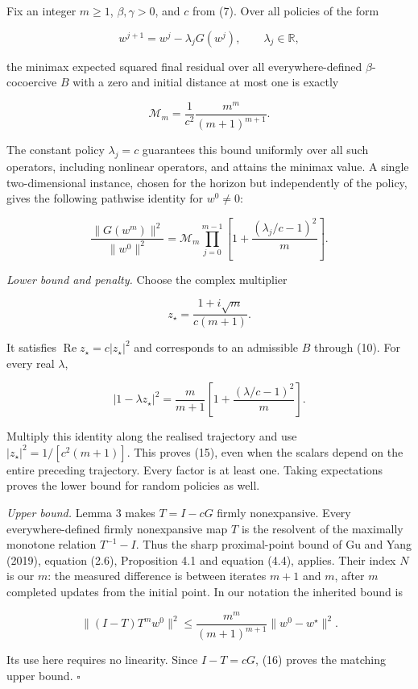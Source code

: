 \documentclass[
  british,
  11pt,
  a4paper,
]{article}
\newcounter{none} %
\begin{document}
Fix an integer \(m\geq1\), \(\beta,\gamma>0\), and \(c\) from (7). Over
all policies of the form

\[w^{j+1}=w^j-\lambda_jG(w^j),\qquad\lambda_j\in\mathbb R,\]

the minimax expected squared final residual over all everywhere-defined
\(\beta\)-cocoercive \(B\) with a zero and initial distance at most one
is exactly

\[
\mathcal M_m=\frac1{c^2}\frac{m^m}{(m+1)^{m+1}}.
\tag{14}
\]

The constant policy \(\lambda_j=c\) guarantees this bound uniformly over
all such operators, including nonlinear operators, and attains the
minimax value. A single two-dimensional instance, chosen for the horizon
but independently of the policy, gives the following pathwise identity
for \(w^0\ne0\):

\[
\frac{\|G(w^m)\|^2}{\|w^0\|^2}
=\mathcal M_m
\prod_{j=0}^{m-1}
\left[1+\frac{(\lambda_j/c-1)^2}{m}\right].
\tag{15}
\]

\emph{Lower bound and penalty.} Choose the complex multiplier

\[z_\star=\frac{1+i\sqrt m}{c(m+1)}.\]

It satisfies \(\operatorname{Re}z_\star=c|z_\star|^2\) and corresponds
to an admissible \(B\) through (10). For every real \(\lambda\),

\[
|1-\lambda z_\star|^2
=\frac{m}{m+1}
\left[1+\frac{(\lambda/c-1)^2}{m}\right].
\]

Multiply this identity along the realised trajectory and use
\(|z_\star|^2=1/[c^2(m+1)]\). This proves (15), even when the scalars
depend on the entire preceding trajectory. Every factor is at least one.
Taking expectations proves the lower bound for random policies as well.

\emph{Upper bound.} Lemma 3 makes \(T=I-cG\) firmly nonexpansive. Every
everywhere-defined firmly nonexpansive map \(T\) is the resolvent of the
maximally monotone relation \(T^{-1}-I\). Thus the sharp proximal-point
bound of Gu and Yang (2019), equation (2.6), Proposition 4.1 and
equation (4.4), applies. Their index \(N\) is our \(m\): the measured
difference is between iterates \(m+1\) and \(m\), after \(m\) completed
updates from the initial point. In our notation the inherited bound is

\[
\|(I-T)T^m w^0\|^2
\leq\frac{m^m}{(m+1)^{m+1}}\|w^0-w^\star\|^2.
\tag{16}
\]

Its use here requires no linearity. Since \(I-T=cG\), (16) proves the
matching upper bound. \(\square\)
\end{document}
